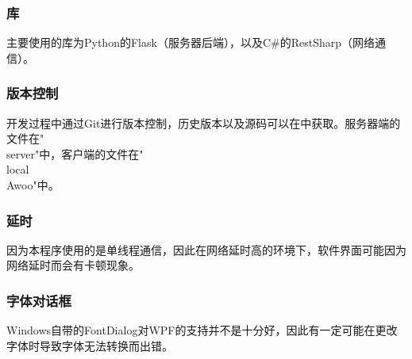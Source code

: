 \documentclass[a4paper,11pt]{article}
\begin{document}
        \subsubsection{库}
            主要使用的库为Python的Flask\textsuperscript{\cite{3}}（服务器后端），以及C\#的RestSharp\textsuperscript{\cite{6}}（网络通信）。
        \subsubsection{版本控制}
            开发过程中通过Git进行版本控制，历史版本以及源码可以在\cite{7}中获取。服务器端的文件在"\\server"中，客户端的文件在"\\local\\Awoo"中。
        \subsubsection{延时}
            因为本程序使用的是单线程通信，因此在网络延时高的环境下，软件界面可能因为网络延时而会有卡顿现象。
        \subsubsection{字体对话框}
            Windows自带的FontDialog对WPF的支持并不是十分好，因此有一定可能在更改字体时导致字体无法转换而出错。
            
\end{document}
